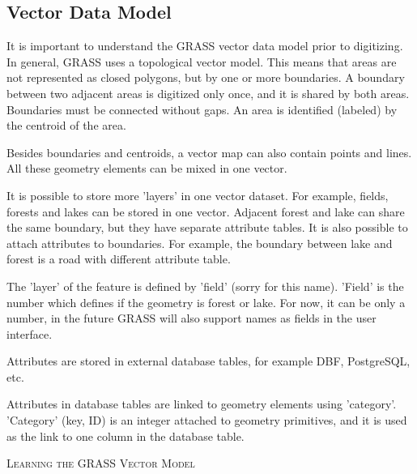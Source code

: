 \subsection{Vector Data Model}
It is important to understand the GRASS vector data model prior to
digitizing.
In general, GRASS uses a topological vector model. This
means that areas are not represented as closed polygons, but by one or more
boundaries. A boundary between two adjacent areas is digitized only once, and it
is shared by both areas. Boundaries must be connected without gaps. An area is
identified (labeled) by the centroid of the area.

Besides boundaries and centroids, a vector map can also contain
points and lines. All these geometry elements can be mixed
in one vector.

It is possible to store more 'layers' in one vector dataset. For example,
fields, forests and lakes can be stored in one vector. Adjacent
forest and lake can share the same boundary, but they have separate attribute tables.
It is also possible to attach attributes to boundaries. For example, the boundary between lake and forest is a road with different attribute table.

The 'layer' of the feature is defined by 'field' (sorry for this name).
'Field' is the number which defines if the geometry is forest or lake.
For now, it can be only a number, in the future GRASS will also support  
names as fields in the user interface.

Attributes are stored in external database tables, for example
DBF, PostgreSQL, etc.

Attributes in database tables are linked to geometry elements
using 'category'. 'Category' (key, ID) is an
integer attached to geometry primitives, and it is used as the link to one
column in the database table.
\begin{Tip}\caption{\textsc{Learning the GRASS Vector Model}}
\end{Tip} 
